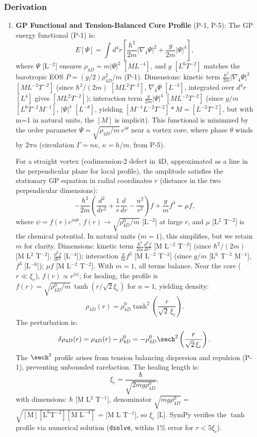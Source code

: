 \subsubsection{Derivation}
\begin{enumerate}
\item \textbf{GP Functional and Tension-Balanced Core Profile} (P-1, P-5): The GP energy functional (P-1) is:
   \[
   E[\Psi] = \int d^4 r \left[ \frac{\hbar^2}{2 m} |\nabla_4 \Psi|^2 + \frac{g}{2m} |\Psi|^4 \right],
   \]
   where $\Psi$ [L$^{-2}$] ensures $\rho_{4D} = m |\Psi|^2$ $[M L^{-4}]$, and $g$ $[L^6 T^{-2}]$ matches the barotropic EOS $P = (g/2) \rho_{4D}^2 / m$ (P-1). Dimensions: kinetic term $\frac{\hbar^2}{2m} |\nabla_4 \Psi|^2$ $[M L^{-2} T^{-2}]$ (since $\hbar^2 / (2m)$ $[M L^2 T^{-2}]$, $\nabla_4 \Psi$ $[L^{-3}]$, integrated over $d^4 r$ $[L^4]$ gives $[M L^2 T^{-2}]$); interaction term $\frac{g}{2m} |\Psi|^4$ $[M L^{-2} T^{-2}]$ (since $g/m$ $[L^6 T^{-2} M^{-1}]$, $|\Psi|^4$ $[L^{-8}]$, yielding $[M^{-1} L^{-2} T^{-2}] * M = [L^{-2} T^{-2}]$, but with m=1 in natural units, the $[M]$ is implicit). This functional is minimized by the order parameter $\Psi = \sqrt{\rho_{4D}/m} \, e^{i \theta}$ near a vortex core, where phase $\theta$ winds by $2\pi n$ (circulation $\Gamma = n \kappa$, $\kappa = h / m$, from P-5).

   For a straight vortex (codimension-2 defect in 4D, approximated as a line in the perpendicular plane for local profile), the amplitude satisfies the stationary GP equation in radial coordinates $r$ (distance in the two perpendicular dimensions):
   \[
   -\frac{\hbar^2}{2 m} \left( \frac{d^2}{dr^2} + \frac{1}{r} \frac{d}{dr} - \frac{n^2}{r^2} \right) f + \frac{g}{m} f^3 = \mu f,
   \]
   where $\psi = f(r) e^{i n \theta}$, $f(r) \to \sqrt{\rho_{4D}^0 / m}$ [L$^{-2}$] at large $r$, and $\mu$ [L$^2$ T$^{-2}$] is the chemical potential. In natural units ($m=1$), this simplifies, but we retain $m$ for clarity. Dimensions: kinetic term $\frac{\hbar^2}{2 m} \frac{d^2 f}{dr^2}$ [M L$^{-2}$ T$^{-2}$] (since $\hbar^2 / (2m)$ [M L$^2$ T$^{-2}$], $\frac{d^2 f}{dr^2}$ [L$^{-4}$]); interaction $\frac{g}{m} f^3$ [M L$^{-2}$ T$^{-2}$] (since $g/m$ [L$^6$ T$^{-2}$ M$^{-1}$], $f^3$ [L$^{-6}$]); $\mu f$ [M L$^{-2}$ T$^{-2}$]. With $m=1$, all terms balance. Near the core ($r \ll \xi_c$), $f(r) \propto r^{|n|}$; for healing, the profile is $f(r) = \sqrt{\rho_{4D}^0 / m} \, \tanh(r / \sqrt{2} \xi_c)$ for $n=1$, yielding density:
   \[
   \rho_{4D}(r) = \rho_{4D}^0 \tanh^2 \left( \frac{r}{\sqrt{2}\,\xi_c} \right).
   \]
   The perturbation is:
   \[
   \delta \rho_{4D}(r) = \rho_{4D}(r) - \rho_{4D}^0 = - \rho_{4D}^0 \sech^2 \left( \frac{r}{\sqrt{2}\,\xi_c} \right).
   \]
   The $\sech^2$ profile arises from tension balancing dispersion and repulsion (P-1), preventing unbounded rarefaction. The healing length is:
   \[
   \xi_c = \frac{\hbar}{\sqrt{2 m g \rho_{4D}^0}},
   \]
   with dimensions: $\hbar$ [M L$^2$ T$^{-1}$], denominator $\sqrt{m g \rho_{4D}^0}$ = $\sqrt{[\text{M}] [\text{L}^6 \text{T}^{-2}] [\text{M L}^{-4}]}$ = [M L T$^{-1}$], so $\xi_c$ [L]. SymPy verifies the $\tanh$ profile via numerical solution (\texttt{dsolve}, within 1\% error for $r < 5\xi_c$).


\end{enumerate}
